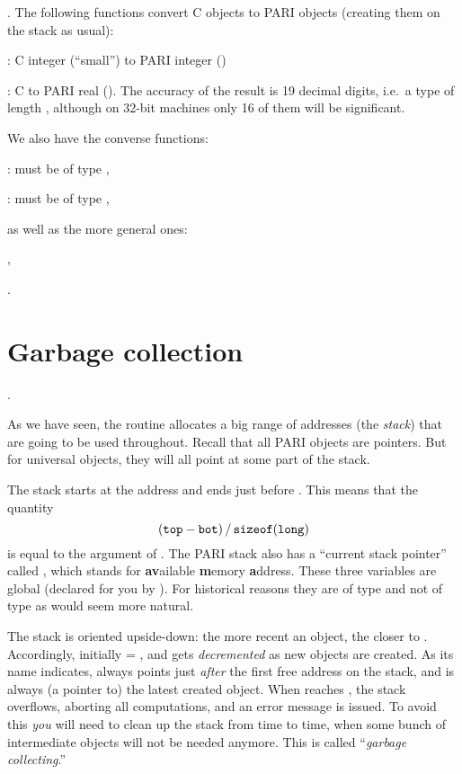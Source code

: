 .
The following functions convert C objects to PARI objects (creating them on
the stack as usual):

: C  integer  (``small'') to PARI integer
()

: C  to PARI real (). The
accuracy of the result is 19 decimal digits, i.e.~a type  of
length , although on 32-bit machines only 16 of them will
be significant.

\noindent We also have the converse functions:

:  must be of type ,

:  must be of type ,

\noindent as well as the more general ones:

,

.

\section{Garbage collection}\label{se:garbage}

.

\noindent
As we have seen, the  routine allocates a big range of
addresses (the {\it stack\/}) that are going to be used throughout. Recall that
all PARI objects are pointers. But for universal objects, they will all point
at some part of the stack.

The stack starts at the address  and ends just before . This
means that the quantity
%
$$ ({\tt top} - {\tt bot})\,/\,{\tt sizeof(long)} $$
%
is equal to the  argument of . The PARI
stack also has a ``current stack pointer'' called , which
stands for {\bf av}ailable {\bf m}emory {\bf a}ddress. These three variables
are global (declared for you by ). For historical reasons they
are of type  and not of type  as would seem more natural.

The stack is oriented upside-down: the more recent an object, the closer to
. Accordingly, initially  = , and  gets
{\it decremented\/} as new objects are created. As its name indicates,
 always points just {\it after\/} the first free address on the
stack, and  is always (a pointer to) the latest created object.
When  reaches , the stack overflows, aborting all
computations, and an error message is issued. To avoid this {\it you\/} will
need to clean up the stack from time to time, when some bunch of intermediate
objects will not be needed anymore. This is called ``{\it garbage
collecting}.''

